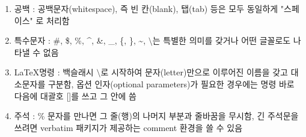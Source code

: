\documentclass[12pt]{article}
\begin{document}
\begin{enumerate}

	\item 
	공백 : 공백문자(whitespace), 즉 빈 칸(blank), 탭(tab) 등은  모두 동일하게 "스페이스" 로 처리함

	\item
	특수문자 : \#, \$, \%, \^{}, \&, \_, \{, \}, \~{}, $\setminus$는  특별한 의미를 갖거나 어떤 글꼴로도 나타낼 수 없음
	
	\item 
	\LaTeX 명령 : 백슬래시 $\setminus$로 시작하여 문자(letter)만으로 이루어진 이름을 갖고 대소문자를 구분함, 옵션 인자(optional parameters)가 필요한 경우에는 명령 바로 다음에 대괄호 []를 쓰고 그 안에 씀

	\item
	주석 : \% 문자를 만나면 그 줄(행)의 나머지 부분과 줄바꿈을 무시함, 긴 주석문을 쓰려면 verbatim 패키지가 제공하는 comment 환경을 쓸 수 있음

\end{enumerate}
\end{document}
